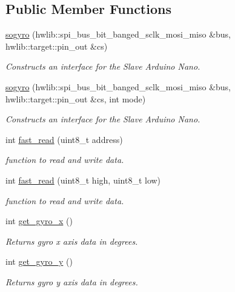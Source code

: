 \subsection*{Public Member Functions}
\begin{DoxyCompactItemize}
\item 
\hyperlink{classsogyro_ac7d4d6dd2fb21e10e9ad95262520635b}{sogyro} (hwlib\+::spi\+\_\+bus\+\_\+bit\+\_\+banged\+\_\+sclk\+\_\+mosi\+\_\+miso \&bus, hwlib\+::target\+::pin\+\_\+out \&cs)
\begin{DoxyCompactList}\small\item\em Constructs an interface for the Slave Arduino Nano. \end{DoxyCompactList}\item 
\hyperlink{classsogyro_a43e6a4ab150faccd436e63c9f41c885d}{sogyro} (hwlib\+::spi\+\_\+bus\+\_\+bit\+\_\+banged\+\_\+sclk\+\_\+mosi\+\_\+miso \&bus, hwlib\+::target\+::pin\+\_\+out \&cs, int mode)
\begin{DoxyCompactList}\small\item\em Constructs an interface for the Slave Arduino Nano. \end{DoxyCompactList}\item 
int \hyperlink{classsogyro_ae8d4d35c21a057146898ee56ccbfca70}{fast\+\_\+read} (uint8\+\_\+t address)
\begin{DoxyCompactList}\small\item\em function to read and write data. \end{DoxyCompactList}\item 
int \hyperlink{classsogyro_a65a601a9536aefcad18969ef5969fe11}{fast\+\_\+read} (uint8\+\_\+t high, uint8\+\_\+t low)
\begin{DoxyCompactList}\small\item\em function to read and write data. \end{DoxyCompactList}\item 
int \hyperlink{classsogyro_a69d818342aa6a4688afc26d8db62af33}{get\+\_\+gyro\+\_\+x} ()
\begin{DoxyCompactList}\small\item\em Returns gyro x axis data in degrees. \end{DoxyCompactList}\item 
int \hyperlink{classsogyro_a5d0a23dd18a82284625c479df3d1bb9b}{get\+\_\+gyro\+\_\+y} ()
\begin{DoxyCompactList}\small\item\em Returns gyro y axis data in degrees. \end{DoxyCompactList}\item 

\end{DoxyCompactItemize}
